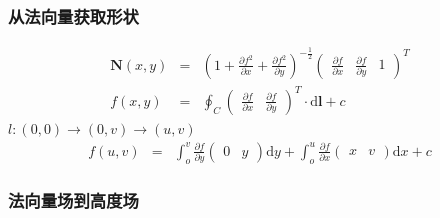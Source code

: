 \documentclass{beamer}
\newcommand{\cdummy}{\cdot}
\newcommand{\mathd}{\mathrm{d}}
\newcommand{\tmmathbf}[1]{\ensuremath{\boldsymbol{#1}}}
\begin{document}
{{\begin{frame}
  \frametitle{从法向量获取形状}
  \begin{eqnarray*}
    \tmmathbf{N} (x, y) & = & \left( 1 + \frac{\partial f^2}{\partial x} +
    \frac{\partial f^2}{\partial y} \right)^{- \frac{1}{2}}
    \left(\begin{array}{ccc}
      \frac{\partial f}{\partial x} & \frac{\partial f}{\partial y} & 1
    \end{array}\right)^T\\
    f (x, y) & = & \oint_C \left(\begin{array}{cc}
      \frac{\partial f}{\partial x} & \frac{\partial f}{\partial y}
    \end{array}\right)^T \cdummy \mathd \tmmathbf{l}+ c
  \end{eqnarray*}
  $l : (0, 0) \rightarrow (0, v) \rightarrow (u, v)$
  \begin{eqnarray*}
    f (u, v) & = & \int_o^v \frac{\partial f}{\partial y}
    \left(\begin{array}{cc}
      0 & y
    \end{array}\right) \mathd y + \int_o^u \frac{\partial f}{\partial x}
    \left(\begin{array}{cc}
      x & v
    \end{array}\right) \mathd x + c
  \end{eqnarray*}
\end{frame}

\begin{frame}
  \frametitle{法向量场到高度场}
  
\end{frame}

}}
\end{document}
